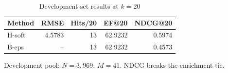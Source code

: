 \par
\begin{table}[H]
\centering
\begin{threeparttable}
\caption{Development-set results at $k=20$}\label{tab:development}
\begin{tabular}{@{}lrrrr@{}}
\toprule
Method & RMSE & Hits/20 & EF@20 & NDCG@20\\
\midrule
H-soft & 4.5783 & 13 & 62.9232 & 0.5974\\
B-eps & -- & 13 & 62.9232 & 0.4573\\
\bottomrule
\end{tabular}
\begin{tablenotes}[flushleft]
\item[] Development pool: $N=3{,}969$, $M=41$. NDCG breaks the enrichment tie.
\end{tablenotes}
\end{threeparttable}
\end{table}
\par
